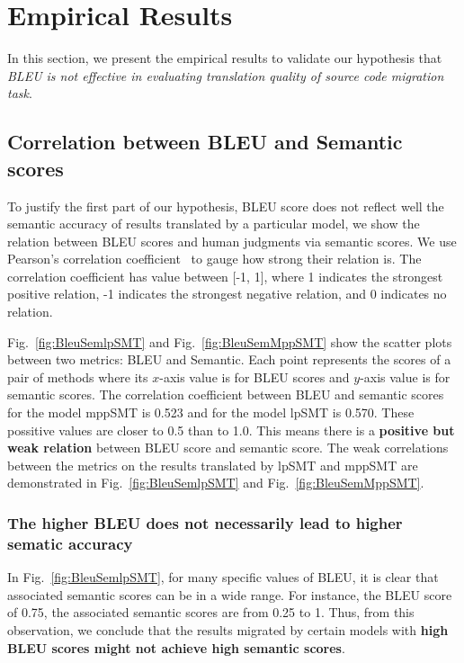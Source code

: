 \section{Empirical Results}
\label{sec:bleuresult}

In this section, we present the empirical results to validate our hypothesis that 
\textit{BLEU is not effective in evaluating translation quality of source code migration task}.
\subsection{Correlation between BLEU and Semantic scores}
To justify the first part of our hypothesis, BLEU score does not reflect well 
the semantic accuracy of results translated by a particular model, 
we show the relation between BLEU scores and human judgments via semantic scores. 
We use Pearson's correlation coefficient~\cite{PearsonCorrelation} to gauge
how strong their relation is. The correlation coefficient has value
between [-1, 1], where 1 indicates the strongest positive relation, -1
indicates the strongest negative relation, and 0 indicates no relation.

Fig.~\ref{fig:BleuSemlpSMT} and Fig.~\ref{fig:BleuSemMppSMT} show the
scatter plots between two metrics: BLEU and Semantic. Each point
represents the scores of a pair of methods where its $x$-axis value is
for BLEU scores and $y$-axis value is for semantic scores. The
correlation coefficient between BLEU and semantic scores for the model
mppSMT is 0.523 and for the model lpSMT is 0.570. These possitive values 
are closer to 0.5 than to 1.0. This means there is a {\bf positive but weak 
relation} between BLEU score and semantic score. The weak correlations %
between the metrics on the results translated by lpSMT and mppSMT are 
demonstrated in Fig.~\ref{fig:BleuSemlpSMT} and Fig.~\ref{fig:BleuSemMppSMT}.


\subsubsection{The higher BLEU does not necessarily lead to higher
sematic accuracy}

In Fig.~\ref{fig:BleuSemlpSMT}, for many specific values of BLEU, it 
is clear that associated semantic scores can be in a wide range. For 
instance, the BLEU score of 0.75, the associated semantic scores are 
from 0.25 to 1.
Thus, from this observation, we conclude that the results migrated by
certain models with {\bf high BLEU scores might not achieve high semantic
scores}.
%


